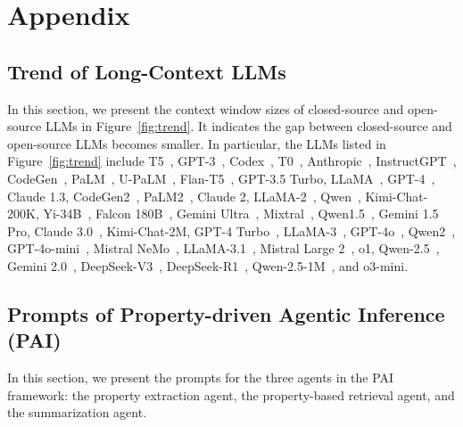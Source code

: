 \appendix

\section{Appendix} \label{sec:appendix}


\subsection{Trend of Long-Context LLMs}
In this section, we present the context window sizes of closed-source and open-source LLMs in Figure~\ref{fig:trend}. It indicates the gap between closed-source and open-source LLMs becomes smaller. In particular, the LLMs listed in Figure~\ref{fig:trend} include T5~\cite{raffel2020exploring}, GPT-3~\cite{brown2020language}, Codex~\cite{chen2021evaluating}, T0~\cite{sanh2022multitask}, Anthropic~\cite{priyanshu2024ai}, InstructGPT~\cite{ouyang2022training}, CodeGen~\cite{nijkamp2023codegen}, PaLM~\cite{chowdhery2023palm}, U-PaLM~\cite{tay2022transcending}, Flan-T5~\cite{chung2024scaling}, GPT-3.5 Turbo, LLaMA~\cite{touvron2023llama}, GPT-4~\cite{achiam2023gpt}, Claude 1.3, CodeGen2~\cite{nijkamp2023codegen2}, PaLM2~\cite{anil2023palm}, Claude 2, LLaMA-2~\cite{touvron2023llama}, Qwen~\cite{bai2023qwen}, Kimi-Chat-200K, Yi-34B~\cite{young2024yi}, Falcon 180B~\cite{almazrouei2023falcon}, Gemini Ultra~\cite{team2023gemini}, Mixtral~\cite{jiang2024mixtral}, Qwen1.5~\cite{qwen2024qwen1-5}, Gemini 1.5 Pro, Claude 3.0~\cite{anthropic2024claude3}, Kimi-Chat-2M, GPT-4 Turbo~\cite{achiam2023gpt}, LLaMA-3~\cite{dubey2024llama}, GPT-4o~\cite{hurst2024gpt}, Qwen2~\cite{yang2024qwen2}, GPT-4o-mini~\cite{hurst2024gpt}, Mistral NeMo~\cite{mistral2024mistralnemo}, LLaMA-3.1~\cite{dubey2024llama}, Mistral Large 2~\cite{mistral2024mistrallarge}, o1, Qwen-2.5~\cite{yang2024qwen2-5}, Gemini 2.0~\cite{pichai2024gemini2}, DeepSeek-V3~\cite{liu2024deepseek}, DeepSeek-R1~\cite{guo2025deepseek}, Qwen-2.5-1M~\cite{yang2024qwen2-5}, and o3-mini.



\subsection{Prompts of Property-driven Agentic Inference (PAI)}
In this section, we present the prompts for the three agents in the PAI framework: the property extraction agent, the property-based retrieval agent, and the summarization agent.



